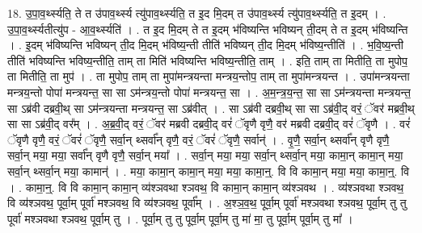\documentclass[17pt]{extarticle}
\begin{document}
18. उ॒पा॒व॒र्थ्स्यति॒ ते त उ॑पाव॒र्थ्स्य त्यु॑पाव॒र्थ्स्यति॒ त इ॒द मि॒दम् त उ॑पाव॒र्थ्स्य त्यु॑पाव॒र्थ्स्यति॒ त इ॒दम् । . उ॒पा॒व॒र्थ्स्यतीत्यु॑प - आ॒व॒र्थ्स्यति॑ । . त इ॒द मि॒दम् ते त इ॒दम् भ॑विष्यन्ति भविष्यन् ती॒दम् ते त इ॒दम् भ॑विष्यन्ति । . इ॒दम् भ॑विष्यन्ति भविष्यन् ती॒द मि॒दम् भ॑विष्य॒न्ती तीति॑ भविष्यन् ती॒द मि॒दम् भ॑विष्य॒न्तीति॑ । . भ॒वि॒ष्य॒न्ती तीति॑ भविष्यन्ति भविष्य॒न्तीति॒ ताम् ता मिति॑ भविष्यन्ति भविष्य॒न्तीति॒ ताम् । . इति॒ ताम् ता मितीति॒ ता मुपोप॒ ता मितीति॒ ता मुप॑ । . ता मुपोप॒ ताम् ता मुपा॑मन्त्रयन्ता मन्त्रय॒न्तोप॒ ताम् ता मुपा॑मन्त्रयन्त । . उपा॑मन्त्रयन्ता मन्त्रय॒न्तो पोपा॑ मन्त्रयन्त॒ सा सा ऽम॑न्त्रय॒न्तो पोपा॑ मन्त्रयन्त॒ सा । . अ॒म॒न्त्र॒य॒न्त॒ सा सा ऽम॑न्त्रयन्ता मन्त्रयन्त॒ सा ऽब्र॑वी दब्रवी॒थ् सा ऽम॑न्त्रयन्ता मन्त्रयन्त॒ सा ऽब्र॑वीत् । . सा ऽब्र॑वी दब्रवी॒थ् सा सा ऽब्र॑वी॒द् वरं॒ ॅवर॑ मब्रवी॒थ् सा सा ऽब्र॑वी॒द् वर᳚म् । . अ॒ब्र॒वी॒द् वरं॒ ॅवर॑ मब्रवी दब्रवी॒द् वरं॑ ॅवृणै वृणै॒ वर॑ मब्रवी दब्रवी॒द् वरं॑ ॅवृणै । . वरं॑ ॅवृणै वृणै॒ वरं॒ ॅवरं॑ ॅवृणै॒ सर्वा॒न् थ्सर्वा᳚न् वृणै॒ वरं॒ ॅवरं॑ ॅवृणै॒ सर्वान्॑ । . वृ॒णै॒ सर्वा॒न् थ्सर्वा᳚न् वृणै वृणै॒ सर्वा॒न् मया॒ मया॒ सर्वा᳚न् वृणै वृणै॒ सर्वा॒न् मया᳚ । . सर्वा॒न् मया॒ मया॒ सर्वा॒न् थ्सर्वा॒न् मया॒ कामा॒न् कामा॒न् मया॒ सर्वा॒न् थ्सर्वा॒न् मया॒ कामान्॑ । . मया॒ कामा॒न् कामा॒न् मया॒ मया॒ कामा॒न्॒. वि वि कामा॒न् मया॒ मया॒ कामा॒न्॒. वि । . कामा॒न्॒. वि वि कामा॒न् कामा॒न् व्य॑श्ञवथा श्ञवथ॒ वि कामा॒न् कामा॒न् व्य॑श्ञवथ । . व्य॑श्ञवथा श्ञवथ॒ वि व्य॑श्ञवथ॒ पूर्वा॒म् पूर्वा॑ मश्ञवथ॒ वि व्य॑श्ञवथ॒ पूर्वा᳚म् । . अ॒श्ञ॒व॒थ॒ पूर्वा॒म् पूर्वा॑ मश्ञवथा श्ञवथ॒ पूर्वा॒म् तु तु पूर्वा॑ मश्ञवथा श्ञवथ॒ पूर्वा॒म् तु । . पूर्वा॒म् तु तु पूर्वा॒म् पूर्वा॒म् तु मा॑ मा॒ तु पूर्वा॒म् पूर्वा॒म् तु मा᳚ । \newline
\end{document}

